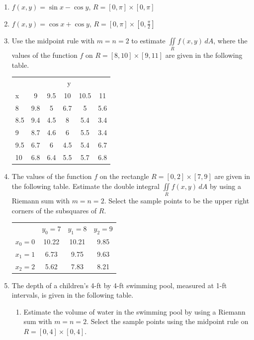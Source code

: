 \documentclass{exercises}
\begin{document}
\begin{enumerate}[resume]
\item $f(x,y)=\sin x-\cos y$, $R=[0,\pi]\times [0,\pi]$
\item $f(x,y)=\cos x+\cos y$, $R=[0,\pi]\times [0,\frac{\pi}{2}]$
\item Use the midpoint rule with $m=n=2$ to estimate $\underset{R}{\iint}f(x,y)\,dA$, where the values of the function $f$ on $R=[8,10]\times [9,11]$ are given in the following table. \begin{center}
\begin{tabular}{lccccc}
\hline
 & \multicolumn{5}{c}{y} \\
x & 9 & 9.5 & 10 & 10.5 & 11 \\
8 & 9.8 & 5 & 6.7 & 5 & 5.6 \\
8.5 & 9.4 & 4.5 & 8 & 5.4 & 3.4 \\
9 & 8.7 & 4.6 & 6 & 5.5 & 3.4 \\
9.5 & 6.7 & 6 & 4.5 & 5.4 & 6.7 \\
10 & 6.8 & 6.4 & 5.5 & 5.7 & 6.8 \\
\hline
\end{tabular}
\end{center}
\item The values of the function $f$ on the rectangle $R=[0,2]\times [7,9]$ are given in the following table. Estimate the double integral $\underset{R}{\iint}f(x,y)\,dA$ by using a Riemann sum with $m=n=2$. Select the sample points to be the upper right corners of the subsquares of $R$. \begin{center}
\begin{tabular}{lccc}
\hline
 & $y_{0}=7$ & $y_{1}=8$ & $y_{2}=9$ \\
$x_{0}=0$ & 10.22 & 10.21 & 9.85 \\
$x_{1}=1$ & 6.73 & 9.75 & 9.63 \\
$x_{2}=2$ & 5.62 & 7.83 & 8.21 \\
\hline
\end{tabular}
\end{center}
\item The depth of a children's 4-ft by 4-ft swimming pool, measured at 1-ft intervals, is given in the following table.
\begin{enumerate}[label=(\alph*)]
  \item Estimate the volume of water in the swimming pool by using a Riemann sum with $m=n=2$. Select the sample points using the midpoint rule on $R=[0,4]\times [0,4]$.

\end{enumerate}
\end{enumerate}
\end{document}
